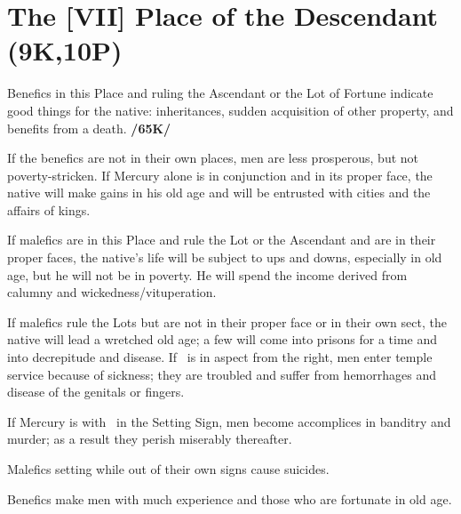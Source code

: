\section{The [VII] Place of the Descendant (9K,10P)}
Benefics in this Place and ruling the Ascendant or the Lot of Fortune indicate good things for the native: inheritances, sudden acquisition of other property, and benefits from a death. \textbf{/65K/} 

If the benefics are not in their own places, men are less prosperous, but not poverty-stricken. If Mercury alone is in conjunction and in its proper face, the native will make gains in his old age and will be entrusted with cities and the affairs of kings. 

If malefics are in this Place and rule the Lot or the Ascendant and are in their proper faces, the native’s life will be subject to ups and downs, especially in old age, but he will not be in poverty. He will spend the income derived from calumny and wickedness/vituperation. 

If malefics rule the Lots but are not in their proper face or in their own sect, the native will lead a wretched old age; a few will come into prisons for a time and into decrepitude and disease. If \Jupiter\, is in aspect from the right, men enter temple service because of sickness; they are troubled and suffer from hemorrhages and disease of the genitals or fingers. 

If Mercury is with \Mars\, in the Setting Sign, men become accomplices in banditry and murder; as a result they perish miserably thereafter. 

Malefics setting while out of their own signs cause suicides.

Benefics make men with much experience and those who are fortunate in old age.

\newpage